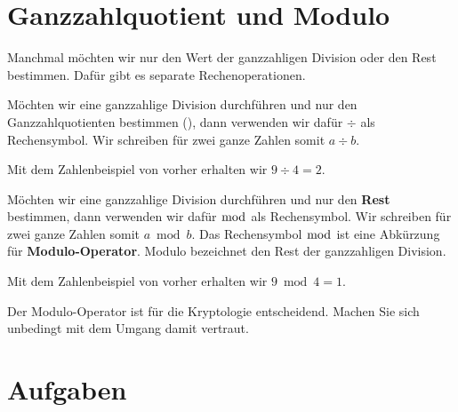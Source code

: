 \begin{example}
\end{example}

\section{Ganzzahlquotient und Modulo}

Manchmal möchten wir nur den Wert der ganzzahligen Division oder den Rest bestimmen. Dafür gibt es separate Rechenoperationen.

\begin{definition}[Ganzzahlquotienten]
Möchten wir eine ganzzahlige Division durchführen und nur den Ganzzahlquotienten bestimmen (), dann verwenden wir dafür $\div$ als Rechensymbol. Wir schreiben für zwei ganze Zahlen somit $a \div b$.	
\end{definition}

\begin{example}
Mit dem Zahlenbeispiel von vorher erhalten wir $9 \div 4 = 2$. 
\end{example}

\begin{definition}[Modulo]
Möchten wir eine ganzzahlige Division durchführen und nur den \textbf{Rest} bestimmen, dann verwenden wir dafür $\bmod$ als Rechensymbol. Wir schreiben für zwei ganze Zahlen somit $a \bmod b$.  Das Rechensymbol $\bmod$ ist eine Abkürzung für \textbf{Modulo-Operator}. Modulo bezeichnet den Rest der ganzzahligen Division.
\end{definition}

\begin{example}
Mit dem Zahlenbeispiel von vorher erhalten wir $9 \bmod 4 = 1$. 
\end{example}

\begin{important}
Der Modulo-Operator ist für die Kryptologie entscheidend. Machen Sie sich unbedingt mit dem Umgang damit vertraut.
\end{important}


\section{Aufgaben}


